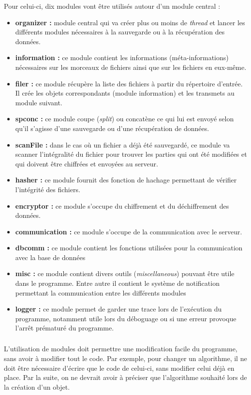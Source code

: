 \documentclass[a4paper,10pt, twoside]{report}
\begin{document}
\begin{spacing}{1.2}
Pour celui-ci, dix modules vont être utilisés autour d'un module central :
\begin{itemize}
  \item \textbf{organizer :} module central qui va créer plus ou moins de
  \textit{thread} et lancer les différents modules nécessaires à la
  sauvegarde ou à la récupération des données.
  \item \textbf{information :} ce module contient les informations
  (méta-informations) nécessaires sur les morceaux de fichiers ainsi que
  sur les fichiers en eux-même.
  \item \textbf{filer :} ce module récupère la liste des fichiers à
  partir du répertoire d'entrée. Il crée les objets correspondants
  (module information) et les transmets au module suivant.
  \item \textbf{spconc :} ce module coupe (\textit{split}) ou concatène ce
  qui lui est envoyé selon qu'il s'agisse d'une sauvegarde ou d'une
  récupération de données.
  \item \textbf{scanFile :} dans le cas où un fichier a déjà été
  sauvegardé, ce module va scanner l'intégralité du fichier pour trouver
  les parties qui ont été modifiées et qui doivent être chiffrées et
  envoyées au serveur.
  \item \textbf{hasher :} ce module fournit des fonction de hachage permettant
  de vérifier l'intégrité des fichiers.
  \item \textbf{encryptor :} ce module s'occupe du chiffrement et du
  déchiffrement des données.
  \item \textbf{communication :} ce module s'occupe de la communication avec
  le serveur.
  \item \textbf{dbcomm :} ce module contient les fonctions utilisées pour la
  communication avec la base de données
  \item \textbf{misc :} ce module contient divers outils
  (\textit{miscellaneous}) pouvant être utile dans le programme. Entre autre
  il contient le système de notification permettant la communication entre
  les différents modules
  \item \textbf{logger :} ce module permet de garder une trace lors de
  l'exécution du programme, notamment utile lors du déboguage ou si une
  erreur provoque l'arrêt prématuré du programme.
\end{itemize}

\subparagraph{}
L'utilisation de modules doit permettre une modification facile du programme,
sans avoir à modifier tout le code. Par exemple, pour changer un algorithme,
il ne doit être nécessaire d'écrire que le code de celui-ci, sans
modifier celui déjà en place. Par la suite, on ne devrait avoir à
préciser que l'algorithme souhaité lors de la création d'un objet.


\end{spacing}
\end{document}
